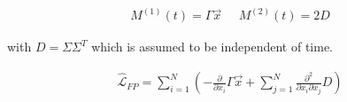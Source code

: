\documentclass{article}
\begin{document}
\begin{align*}
M^{(1)}(t) = \Gamma \vec{x}\;\;\;\;\;M^{(2)}(t) = 2D
\end{align*}

with $D = \Sigma\Sigma^{T}$ which is assumed to be independent of time.

\begin{align}
\hat{\mathcal{L}}_{FP} = \sum_{i=1}^{N}\left(-\frac{\partial}{\partial x_{i}}\Gamma\vec{x} + \sum_{j=1}^{N} \frac{\partial^{2}}{\partial x_{i}\partial x_{j}}D\right)
\end{align}
\end{document}
